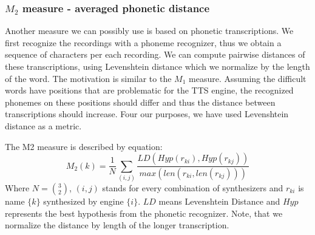 \subsubsection{$M_2$ measure - averaged phonetic distance}
Another measure we can possibly use is based on phonetic transcriptions. We first recognize the recordings with a phoneme recognizer, thus we obtain a sequence of characters per each recording. We can compute pairwise distances of these transcriptions, using Levenshtein \cite{navarro2001guided} distance which we normalize by the length of the word. The motivation is similar to the $M_1$ measure. Assuming the difficult words have positions that are problematic for the TTS engine, the recognized phonemes on these positions should differ and thus the distance between transcriptions should increase. Four our purposes, we have used Levenshtein distance as a metric.
\par
The M2 measure is described by equation:
\begin{equation}
M_2(k) = \frac{1}{N}\sum_{(i,j)}{\frac{LD(Hyp(r_{ki}),Hyp(r_{kj}))}{max(len(r_{ki},len(r_{kj})))}}
\end{equation}
Where $N = {3\choose2}$, $(i,j)$ stands for every combination of synthesizers and $r_{ki}$ is name $\{k\}$ synthesized by engine $\{i\}$. $LD$ means Levenshtein Distance and $Hyp$ represents the best hypothesis from the phonetic recognizer. Note, that we normalize the distance by length of the longer transcription.

